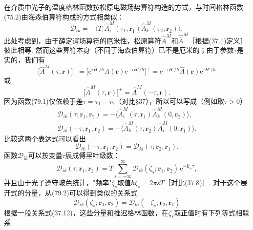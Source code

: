 在介质中光子的温度格林函数按松原电磁场势算符构造的方式，与时间格林函数(75.2)由海森伯算符构成的方式相类似：
\begin{equation}
\mathcal{D}_{ik}=-\langle T_{\tau}\hat{A}_{i}^{M}(\tau_{1},\bm{r}_{1})\hat{A}_{k}^{M}(\tau_{2},\bm{r}_{2})\rangle,
\end{equation}
此处考虑到，由于薛定谔场算符的厄米性，松原算符$\hat{A}^{M}$和$\hat{\overline{A}}^{M}$［根据(37.1)定义］彼此相等. 然而这些算符本身（不同于海森伯算符）已不是厄米的；由于参数$\tau$是实的，我们有
\begin{equation*}
\bigl[\hat{A}^{M}(\tau,\bm{r})\bigr]^{+}=\bigl[\mathrm{e}^{\tau\hat{H}'/\hbar}\hat{A}(\bm{r})\mathrm{e}^{-\tau\hat{H}'/\hbar}\bigr]^{+}=\mathrm{e}^{-\tau\hat{H}'/\hbar}\hat{A}(\bm{r})\mathrm{e}^{\tau\hat{H}'/\hbar}
\end{equation*}
或
\begin{equation*}
\bigl[\hat{A}^{M}(\tau,\bm{r})\bigr]^{+}=\hat{A}^{M}(-\tau,\bm{r}).
\end{equation*}
因为函数(79.1)仅依赖于差$\tau=\tau_{1}-\tau_{2}$（对比§37），所以可以写成（例如取$\tau>0$）
\begin{equation*}
\begin{gathered}
\mathcal{D}_{ik}(\tau;\bm{r}_{1},\bm{r}_{2})=-\bigl\langle\hat{A}_{i}^{M}(\tau,\bm{r}_{1})\hat{A}_{k}^{M}(0,\bm{r}_{2})\bigr\rangle,\\
\mathcal{D}_{ik}(-\tau;\bm{r}_{1},\bm{r}_{2})=-\bigl\langle\hat{A}_{k}^{M}(\tau,\bm{r}_{2})\hat{A}_{i}^{M}(0,\bm{r}_{1})\bigr\rangle.
\end{gathered}
\end{equation*}
比较这两个表达式可以看出
\begin{equation}
\mathcal{D}_{ik}(-\tau;\bm{r}_{1},\bm{r}_{2})=\mathcal{D}_{ki}(\tau;\bm{r}_{2},\bm{r}_{1}).
\end{equation}
函数$\mathcal{D}_{ik}$可以按变量$\tau$展成傅里叶级数：
\begin{equation}
\mathcal{D}_{ik}(\tau;\bm{r}_{1},\bm{r}_{2})=T\sum_{s=-\infty}^{\infty}\mathcal{D}_{ik}(\zeta_{s};\bm{r}_{1},\bm{r}_{2})\,\mathrm{e}^{-\mathrm{i}\zeta_{s}\tau},
\end{equation}
并且由于光子遵守玻色统计，"频率"$\zeta_{s}$取值$\hbar\zeta_{s}=2\pi sT$［对比(37.8)］. 对于这个展开式的分量，从(79.2)可以得到类似的关系式
\begin{equation}
\mathcal{D}_{ik}(\zeta_{s};\bm{r}_{1},\bm{r}_{2})=\mathcal{D}_{ki}(-\zeta_{s};\bm{r}_{2},\bm{r}_{1})
\end{equation}
根据一般关系式(37.12)，这些分量和推迟格林函数，在$\zeta_{s}$取正值时有下列等式相联系
